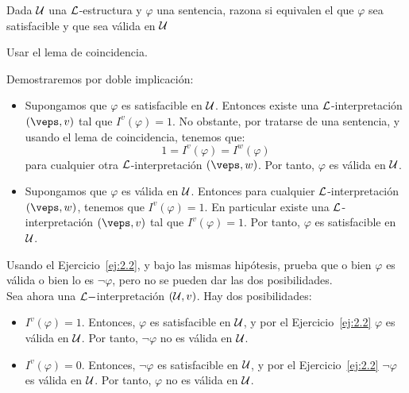 \begin{ejercicio}\label{ej:2.2}
    Dada $\mathcal{U}$ una $\mathcal{L}$-estructura y $\varphi$ una sentencia, razona si equivalen el que $\varphi$ sea satisfacible y que sea válida en $\mathcal{U}$
    \begin{observacion}
        Usar el lema de coincidencia.
    \end{observacion}

    Demostraremos por doble implicación:
    \begin{itemize}
        \item[$\Longrightarrow)$] Supongamos que $\varphi$ es satisfacible en $\mathcal{U}$. Entonces existe una $\mathcal{L}$-interpretación $(\veps,v)$ tal que $I^v(\varphi) = 1$. No obstante, por tratarse de una sentencia, y usando el lema de coincidencia, tenemos que:
        \begin{equation*}
            1 = I^v(\varphi) = I^{w}(\varphi)
        \end{equation*}
        para cualquier otra $\mathcal{L}$-interpretación $(\veps,w)$. Por tanto, $\varphi$ es válida en $\mathcal{U}$.

        \item[$\Longleftarrow)$] Supongamos que $\varphi$ es válida en $\mathcal{U}$. Entonces para cualquier $\mathcal{L}$-interpretación $(\veps,w)$, tenemos que $I^v(\varphi) = 1$. En particular existe una $\mathcal{L}$-interpretación $(\veps,v)$ tal que $I^v(\varphi) = 1$. Por tanto, $\varphi$ es satisfacible en $\mathcal{U}$.
    \end{itemize}
\end{ejercicio}

\begin{ejercicio}\label{ej:2.3}
    Usando el Ejercicio~\ref{ej:2.2}, y bajo las mismas hipótesis, prueba que o bien $\varphi$ es válida o bien lo es $\neg \varphi$, pero no se pueden dar las dos posibilidades.\\

    Sea ahora una $\mathcal{L}-$interpretación $(\mathcal{U},v)$. Hay dos posibilidades:
    \begin{itemize}
        \item \ul{$I^v(\varphi) = 1$}. Entonces, $\varphi$ es satisfacible en $\mathcal{U}$, y por el Ejercicio~\ref{ej:2.2} $\varphi$ es válida en $\mathcal{U}$. Por tanto, $\neg \varphi$ no es válida en $\mathcal{U}$.
        
        \item \ul{$I^v(\varphi) = 0$}. Entonces, $\neg \varphi$ es satisfacible en $\mathcal{U}$, y por el Ejercicio~\ref{ej:2.2} $\neg \varphi$ es válida en $\mathcal{U}$. Por tanto, $\varphi$ no es válida en $\mathcal{U}$.
    \end{itemize}
\end{ejercicio}

